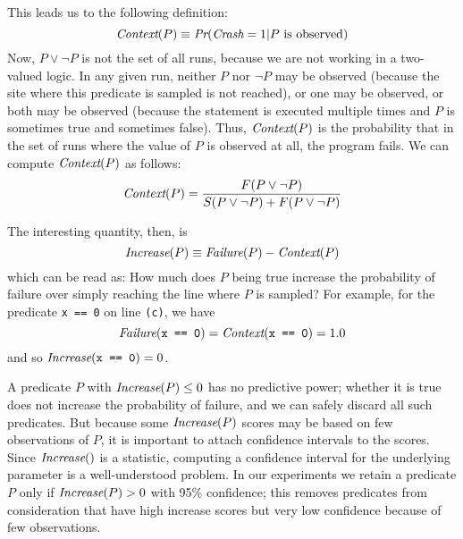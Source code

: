 This leads us to the following definition:
\[
\issue{modified by Alice}
\issue[Mike]{I've never liked the notation "Prob((P \or \not P) \implies Crash)".  
What this quantity really is is "Prob(Crash | P = true \or P = false)".  
Just like with Failure(P), Context(P) is a conditional probability.}
\context(P) \equiv \prob(\fail = 1 | P \mbox{ is observed})  
\]
Now, $P \lor \lnot P$ is not the set of all runs, because we are not working in a two-valued logic.
In any given run, neither $P$ nor $\lnot P$ may be observed (because the site where this predicate is
sampled is not reached),
or one may be observed, or both may be observed (because the statement is executed
multiple times and $P$ is sometimes true and sometimes false).  Thus, $\textit{Context}(P)$ is the probability that
in the set of runs where the value of $P$ is observed at all, the program fails. We can compute $\textit{Context}(P)$ as follows:
\[ \textit{Context}(P) = \frac{F(P \lor \lnot P)}{S(P \lor \lnot P) + F(P \lor \lnot P)} \]

The interesting quantity, then, is
\begin{equation*}
 \textit{Increase}(P) \equiv \textit{Failure}(P) - \textit{Context}(P) \label{eqn:1}
\end{equation*}
which can be read as: How much does $P$ being true increase the probability of failure
over simply reaching the line where $P$ is sampled?  For example, for the predicate {\tt x == 0} on line {\tt (c)},
we have
\[\textit{Failure}(\mbox{\tt x == 0}) = \textit{Context}(\mbox{\tt x == 0}) = 1.0 \]
and so $\textit{Increase}(\mbox{\tt x == 0}) = 0$.

A predicate $P$ with $\textit{Increase}(P) \leq 0$ has no predictive power; whether it is true does not increase the
probability of failure, and we can safely discard all such predicates.
But because some $\textit{Increase}(P)$ scores may be based on few observations of $P$, it is important
to attach confidence intervals to the scores.  Since $\textit{Increase}()$ is a statistic, computing
a confidence interval for the underlying parameter is a well-understood problem. In our experiments we retain a predicate $P$
only if $\textit{Increase}(P) > 0$ with 95\% confidence; this removes predicates from consideration that have high
increase scores but very low confidence because of few observations. 

